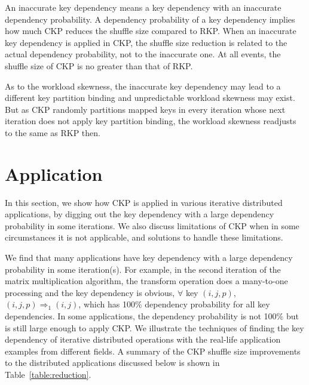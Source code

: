 \documentclass[10pt,journal,compsoc]{IEEEtran}
\begin{document}
An inaccurate key dependency means a key dependency with 
an inaccurate dependency probability. 
A dependency probability of a key dependency implies 
how much CKP reduces the shuffle size compared to RKP.
When an inaccurate key dependency is applied
in CKP, the shuffle size reduction
is related to the actual dependency probability, not to the inaccurate one. 
At all events, the shuffle size of CKP is no greater than that of RKP. 

As to the workload skewness, the inaccurate key dependency may lead to 
a different key partition binding and unpredictable workload skewness may exist. 
But as CKP randomly partitions mapped keys in every iteration whose next iteration does not apply key partition binding, 
the workload skewness readjusts to the same as RKP then.



\section{Application}\label{section:application}
In this section, we show how CKP is applied in various
iterative distributed applications, by digging out the key dependency 
with a large dependency probability
in some iterations. 
We also discuss limitations of CKP when in some circumstances it is not applicable, and solutions to handle these limitations. 

We find that many applications have key dependency with 
a large dependency probability in some iteration(s).
For example, 
in the second iteration of the matrix multiplication algorithm, 
the transform operation does a many-to-one processing and the key dependency is obvious, 
$\forall$ key $(i,j,p)$, $(i,j,p) \Rightarrow_{1} (i,j)$,
which has 100\% dependency probability for all key dependencies.
In some applications, the dependency probability is not 100\% but 
is still large enough to apply CKP.
We illustrate the techniques of finding the key dependency of iterative
distributed operations with the real-life application examples from 
different fields.
A summary of the CKP shuffle size improvements to the distributed applications discussed below is shown in Table~\ref{table:reduction}.
\end{document}
